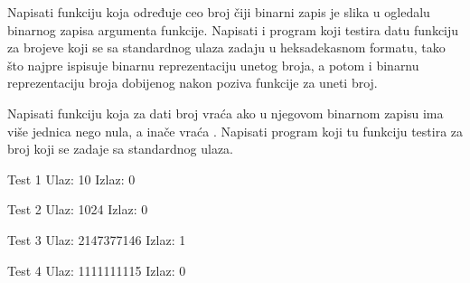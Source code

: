 \begin{Exercise}[label=206]
Napisati funkciju  koja određuje ceo broj čiji binarni zapis je slika u ogledalu binarnog zapisa argumenta funkcije. Napisati i program koji testira datu funkciju za brojeve koji se sa standardnog ulaza zadaju u heksadekasnom formatu, tako što najpre ispisuje binarnu reprezentaciju unetog broja, a potom i binarnu reprezentaciju broja dobijenog nakon poziva funkcije  za uneti broj.
\end{Exercise}
\begin{Answer}[ref=206]
\end{Answer}


\begin{Exercise}[label=207]
Napisati funkciju  koja za dati broj  vraća  ako u njegovom binarnom zapisu ima više jednica nego nula, a inače vraća .  Napisati program koji tu funkciju testira za broj koji se zadaje sa standardnog ulaza.

\begin{minitest}
\begin{test}{Test 1}
Ulaz:   10
Izlaz:  0 
\end{test}
\end{minitest}
\begin{minitest}
\begin{test}{Test 2}
Ulaz:   1024
Izlaz:  0 
\end{test}
\end{minitest}
\begin{minitest}
\begin{test}{Test 3}
Ulaz:   2147377146
Izlaz:  1 
\end{test}
\end{minitest}

\begin{minitest}
\begin{test}{Test 4}
Ulaz:   1111111115
Izlaz:  0 
\end{test}
\end{minitest}

\end{Exercise}
\begin{Answer}[ref=207]
\end{Answer}

